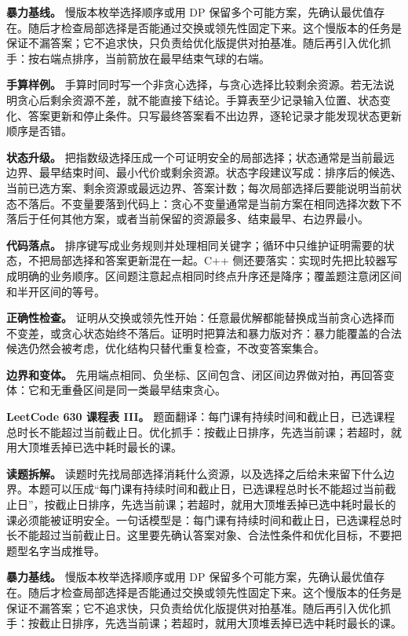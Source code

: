 \textbf{暴力基线。} 慢版本枚举选择顺序或用 DP 保留多个可能方案，先确认最优值存在。随后才检查局部选择是否能通过交换或领先性固定下来。这个慢版本的任务是保证不漏答案；它不追求快，只负责给优化版提供对拍基准。随后再引入优化抓手：按右端点排序，当前箭放在最早结束气球的右端。

\textbf{手算样例。} 手算时同时写一个非贪心选择，与贪心选择比较剩余资源。若无法说明贪心后剩余资源不差，就不能直接下结论。手算表至少记录输入位置、状态变化、答案更新和停止条件。只写最终答案看不出边界，逐轮记录才能发现状态更新顺序是否错。

\textbf{状态升级。} 把指数级选择压成一个可证明安全的局部选择；状态通常是当前最远边界、最早结束时间、最小代价或剩余资源。状态字段建议写成：排序后的候选、当前已选方案、剩余资源或最远边界、答案计数；每次局部选择后要能说明当前状态不落后。不变量要落到代码上：贪心不变量通常是当前方案在相同选择次数下不落后于任何其他方案，或者当前保留的资源最多、结束最早、右边界最小。

\textbf{代码落点。} 排序键写成业务规则并处理相同关键字；循环中只维护证明需要的状态，不把局部选择和答案更新混在一起。C++ 侧还要落实：实现时先把比较器写成明确的业务顺序。区间题注意起点相同时终点升序还是降序；覆盖题注意闭区间和半开区间的等号。

\textbf{正确性检查。} 证明从交换或领先性开始：任意最优解都能替换成当前贪心选择而不变差，或贪心状态始终不落后。证明时把算法和暴力版对齐：暴力能覆盖的合法候选仍然会被考虑，优化结构只替代重复检查，不改变答案集合。

\textbf{边界和变体。} 先用端点相同、负坐标、区间包含、闭区间边界做对拍，再回答变体：它和无重叠区间是同一类最早结束贪心。

\noindent\textbf{LeetCode 630 课程表 III。} 题面翻译：每门课有持续时间和截止日，已选课程总时长不能超过当前截止日。优化抓手：按截止日排序，先选当前课；若超时，就用大顶堆丢掉已选中耗时最长的课。

\textbf{读题拆解。} 读题时先找局部选择消耗什么资源，以及选择之后给未来留下什么边界。本题可以压成“每门课有持续时间和截止日，已选课程总时长不能超过当前截止日”，按截止日排序，先选当前课；若超时，就用大顶堆丢掉已选中耗时最长的课必须能被证明安全。一句话模型是：每门课有持续时间和截止日，已选课程总时长不能超过当前截止日。这里要先确认答案对象、合法性条件和优化目标，不要把题型名字当成推导。

\textbf{暴力基线。} 慢版本枚举选择顺序或用 DP 保留多个可能方案，先确认最优值存在。随后才检查局部选择是否能通过交换或领先性固定下来。这个慢版本的任务是保证不漏答案；它不追求快，只负责给优化版提供对拍基准。随后再引入优化抓手：按截止日排序，先选当前课；若超时，就用大顶堆丢掉已选中耗时最长的课。

